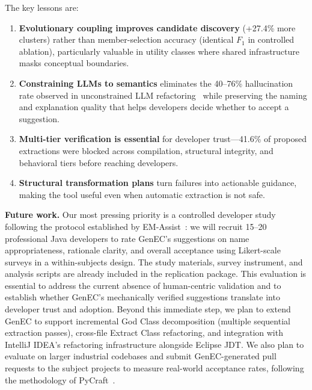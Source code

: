 \documentclass[sigconf]{acmart}
\begin{document}
The key lessons are:
\begin{enumerate}
  \item \textbf{Evolutionary coupling improves candidate discovery} (+27.4\%
        more clusters) rather than member-selection accuracy (identical $F_1$ in
        controlled ablation), particularly valuable in utility classes where
        shared infrastructure masks conceptual boundaries.
  \item \textbf{Constraining LLMs to semantics} eliminates the 40--76\%
        hallucination rate observed in unconstrained LLM
        refactoring~\cite{cassee2024refuctoring, Liu2024Empirical} while
        preserving the naming and explanation quality that helps developers
        decide whether to accept a suggestion.
  \item \textbf{Multi-tier verification is essential} for developer
        trust---41.6\% of proposed extractions were blocked across compilation,
        structural integrity, and behavioral tiers before reaching developers.
  \item \textbf{Structural transformation plans} turn failures into actionable
        guidance, making the tool useful even when automatic extraction is not
        safe.
\end{enumerate}

\textbf{Future work.}  Our most pressing priority is a controlled developer
study following the protocol established by
EM-Assist~\cite{Pomian2024EMAssist}: we will recruit 15--20 professional Java
developers to rate GenEC's suggestions on name appropriateness, rationale
clarity, and overall acceptance using Likert-scale surveys in a
within-subjects design. The study materials, survey instrument, and analysis
scripts are already included in the replication package. This evaluation is
essential to address the current absence of human-centric validation and to
establish whether GenEC's mechanically verified suggestions translate into
developer trust and adoption.  Beyond this immediate step, we plan to extend
GenEC to support incremental God Class decomposition (multiple sequential
extraction passes), cross-file Extract Class refactoring, and integration
with IntelliJ IDEA's refactoring infrastructure alongside Eclipse JDT\@. We also
plan to evaluate on larger industrial codebases and submit GenEC-generated
pull requests to the subject projects to measure real-world acceptance
rates, following the methodology of PyCraft~\cite{Dilhara2024PyCraft}.



\end{document}
